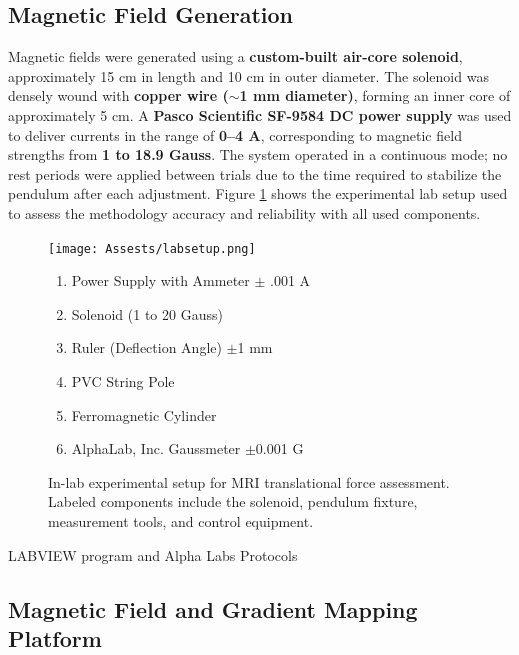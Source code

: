 \subsection*{Magnetic Field Generation}

Magnetic fields were generated using a \textbf{custom-built air-core solenoid}, approximately 15 cm in length and 10 cm in outer diameter. The solenoid was densely wound with \textbf{copper wire ($\sim$1 mm diameter)}, forming an inner core of approximately 5 cm. A \textbf{Pasco Scientific SF-9584 DC power supply} was used to deliver currents in the range of \textbf{0--4 A}, corresponding to magnetic field strengths from \textbf{1 to 18.9 Gauss}. The system operated in a continuous mode; no rest periods were applied between trials due to the time required to stabilize the pendulum after each adjustment. Figure \ref{labsetup} shows the experimental lab setup used to assess the methodology accuracy and reliability with all used components.


\begin{figure}[H]
	\centering
	\begin{minipage}[t]{0.58\textwidth}
		\centering
		\texttt{[image: Assests/labsetup.png]} %
	\end{minipage}%
	\hfill
	\begin{minipage}[t]{0.42\textwidth}
		\footnotesize
		\vspace*{-50ex}
		\begin{enumerate}
			\item Power Supply with Ammeter $\pm$ .001 A 
			\item Solenoid (1 to 20 Gauss)
			\item Ruler (Deflection Angle) $\pm$1 mm 
			\item PVC String Pole
			\item Ferromagnetic Cylinder
			\item AlphaLab, Inc. Gaussmeter $\pm$0.001 G  
		\end{enumerate}
	\end{minipage}
	\caption{In-lab experimental setup for MRI translational force assessment. Labeled components include the solenoid, pendulum fixture, measurement tools, and control equipment.}
	\label{labsetup}
\end{figure}

LABVIEW program and Alpha Labs Protocols


\subsection{Magnetic Field and Gradient Mapping Platform}

